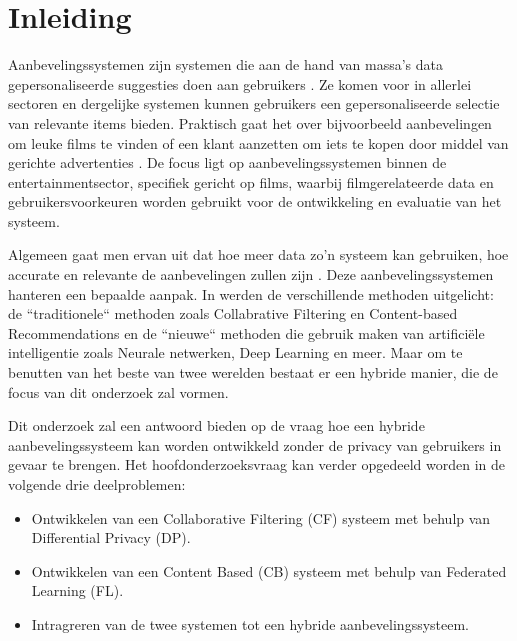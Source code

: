 


% 

\section{Inleiding}%
\label{sec:inleiding}

Aanbevelingssystemen zijn systemen die aan de hand van massa's data gepersonaliseerde suggesties doen aan gebruikers \autocite{Mazeh2020}. Ze komen voor in allerlei sectoren en dergelijke systemen kunnen gebruikers een gepersonaliseerde selectie van relevante items bieden. Praktisch gaat het over bijvoorbeeld aanbevelingen om leuke films te vinden of een klant aanzetten om iets te kopen door middel van gerichte advertenties \autocite{Patel2020}. De focus ligt op aanbevelingssystemen binnen de entertainmentsector, specifiek gericht op films, waarbij filmgerelateerde data en gebruikersvoorkeuren worden gebruikt voor de ontwikkeling en evaluatie van het systeem.

Algemeen gaat men ervan uit dat hoe meer data zo'n systeem kan gebruiken, hoe accurate en relevante de aanbevelingen zullen zijn \autocite{Yang2020}. Deze aanbevelingssystemen hanteren een bepaalde aanpak. In \textcite{Amatriain2014} werden de verschillende methoden uitgelicht: de ``traditionele`` methoden zoals Collabrative Filtering en Content-based Recommendations en de ``nieuwe`` methoden die gebruik maken van artificiële intelligentie zoals Neurale netwerken, Deep Learning en meer. Maar om te benutten van het beste van twee werelden bestaat er een hybride manier, die de focus van dit onderzoek zal vormen.

Dit onderzoek zal een antwoord bieden op de vraag hoe een hybride aanbevelingssysteem kan worden ontwikkeld zonder de privacy van gebruikers in gevaar te brengen. Het hoofdonderzoeksvraag kan verder opgedeeld worden in de volgende drie deelproblemen:
\begin{itemize}
  \item Ontwikkelen van een Collaborative Filtering (CF) systeem met behulp van Differential Privacy (DP).
  \item Ontwikkelen van een Content Based (CB) systeem met behulp van Federated Learning (FL).
  \item Intragreren van de twee systemen tot een hybride aanbevelingssysteem.
\end{itemize}


